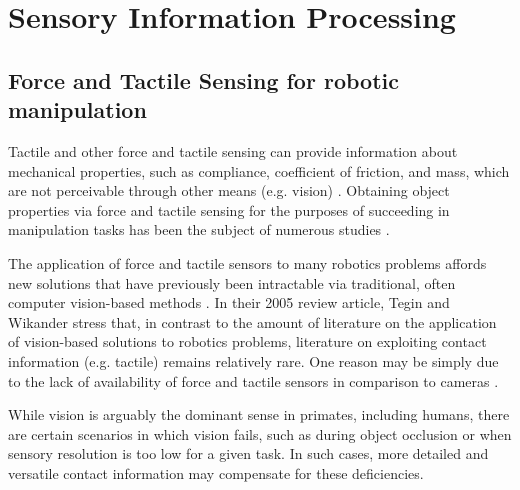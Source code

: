 \section{Sensory Information Processing}


\subsection{Force and Tactile Sensing for robotic manipulation}


Tactile and other force and tactile sensing can provide information about mechanical properties, such as compliance, coefficient of friction, and mass, which are not perceivable through other means (e.g. vision) \cite{howe1993tactile}.
Obtaining object properties via force and tactile sensing for the purposes of succeeding in manipulation tasks has been the subject of numerous studies \cite{Heidemann2004, Detry2011, lepora2012embodied}.

The application of force and tactile sensors to many robotics problems affords new solutions that have previously been intractable via traditional, often computer vision-based methods \cite{lee1999review}.
In their 2005 review article, Tegin and Wikander \cite{tegin2005tactile} stress that, in contrast to the amount of literature on the application of vision-based solutions to robotics problems, literature on exploiting contact information (e.g. tactile) remains relatively rare.
One reason may be simply due to the lack of availability of force and tactile sensors in comparison to cameras \cite{howe1993tactile}.

While vision is arguably the dominant sense in primates, including humans, there are certain scenarios in which vision fails, such as during object occlusion or when sensory resolution is too low for a given task.
In such cases, more detailed and versatile contact information may compensate for these deficiencies.

